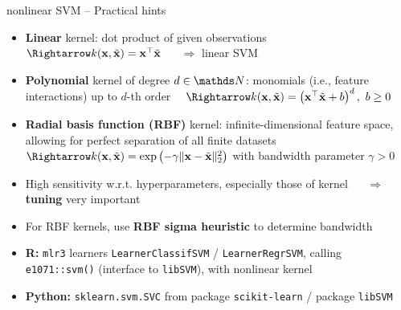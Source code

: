 \begin{frame}{nonlinear SVM -- Practical hints}

\footnotesize


\begin{itemize}
  \item \textbf{Linear} kernel: dot product of given observations ~~ 
  $\Rightarrow \kxxt = \xv^\top \xtil$ ~~ $\Rightarrow$ linear SVM
  \item \textbf{Polynomial} kernel of degree $d \in \N$: monomials (i.e., 
  feature interactions) up to $d$-th 
  order ~~$\Rightarrow 
  \kxxt = \left(\xv^\top \xtil + b \right)^d, ~ b \geq 0$
  \item \textbf{Radial basis function (RBF)} kernel: infinite-dimensional 
  feature space, allowing for perfect separation of all finite 
  datasets ~~ $\Rightarrow \kxxt = \exp \left( -\gamma \| \xv - \xtil \|_2^2 
  \right )$ with 
  bandwidth parameter $\gamma > 0$
\end{itemize}
 
\medskip

 
 \begin{itemize}
  \item High sensitivity w.r.t. hyperparameters, especially those of kernel
  ~~ $\Rightarrow$ \textbf{tuning} very important
  \item For RBF kernels, use \textbf{RBF sigma heuristic} to determine 
  bandwidth
\end{itemize}

  \medskip

\begin{itemize}
  \item \textbf{R:} \texttt{mlr3} learners \texttt{LearnerClassifSVM} /
  \texttt{LearnerRegrSVM}, calling \texttt{e1071::svm()} (interface to 
  \texttt{libSVM}), with nonlinear kernel
  \item \textbf{Python:} \texttt{sklearn.svm.SVC} from package 
  \texttt{scikit-learn} / package \texttt{libSVM}
\end{itemize}

\end{frame}